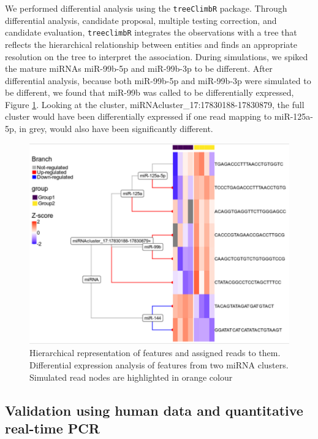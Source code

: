 \documentclass[12pt,twoside]{reedthesis}
\begin{document}
We performed differential analysis using the \texttt{treeClimbR} package.
Through differential analysis, candidate proposal, multiple testing
correction, and candidate evaluation, \texttt{treeclimbR} integrates the
observations with a tree that reflects the hierarchical relationship
between entities and finds an appropriate resolution on the tree to
interpret the association. During simulations, we spiked the mature
miRNAs miR-99b-5p and miR-99b-3p to be different. After differential
analysis, because both miR-99b-5p and miR-99b-3p were simulated to be
different, we found that miR-99b was called to be differentially
expressed, Figure \ref{fig:3f16}. Looking at the cluster,
miRNAcluster\_17:17830188-17830879, the full cluster would have been
differentially expressed if one read mapping to miR-125a-5p, in grey,
would also have been significantly different.




\begin{figure}[htbp]

{\centering \includegraphics{thesis_files/figure-latex/3f16-1} 

}

\caption{Hierarchical representation of features and assigned reads
to them. Differential expression analysis of features from two miRNA
clusters. Simulated read nodes are highlighted in orange colour}\label{fig:3f16}
\end{figure}
\hypertarget{validation-using-human-data-and-quantitative-real-time-pcr}{%
\subsection{Validation using human data and quantitative real-time PCR}\label{validation-using-human-data-and-quantitative-real-time-pcr}}
\end{document}
